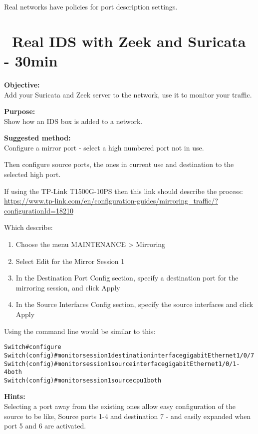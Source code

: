 \documentclass[a4paper,11pt,notitlepage]{report}
\begin{document}
Real networks have policies for port description settings.

\chapter{\faInfoCircle\ Real IDS with Zeek and Suricata - 30min}
\label{ex:suricata-real-network}

{\bf Objective:}\\
Add your Suricata and Zeek server to the network, use it to monitor your traffic.

{\bf Purpose:}\\
Show how an IDS box is added to a network.

{\bf Suggested method:}\\
Configure a mirror port - select a high numbered port not in use.

Then configure source ports, the ones in current use and destination to the selected high port.

If using the TP-Link T1500G-10PS then this link should describe the process:\\
{\small\url{https://www.tp-link.com/en/configuration-guides/mirroring_traffic/?configurationId=18210}}

Which describe:
\begin{enumerate}
\item Choose the menu MAINTENANCE > Mirroring
\item Select Edit for the Mirror Session 1
\item In the Destination Port Config section, specify a destination port for the mirroring session, and click Apply
\item In the Source Interfaces Config section, specify the source interfaces and click Apply
\end{enumerate}

Using the command line would be similar to this:
\begin{alltt}
Switch#configure
Switch(config)#monitor session 1 destination interface gigabitEthernet 1/0/7
Switch(config)#monitor session 1 source interface gigabitEthernet 1/0/1-4 both
Switch(config)#monitor session 1 source cpu 1 both
\end{alltt}


{\bf Hints:}\\
Selecting a port away from the existing ones allow easy configuration of the source to be like, Source ports 1-4 and destination 7 - and easily expanded when port 5 and 6 are activated.
\end{document}
